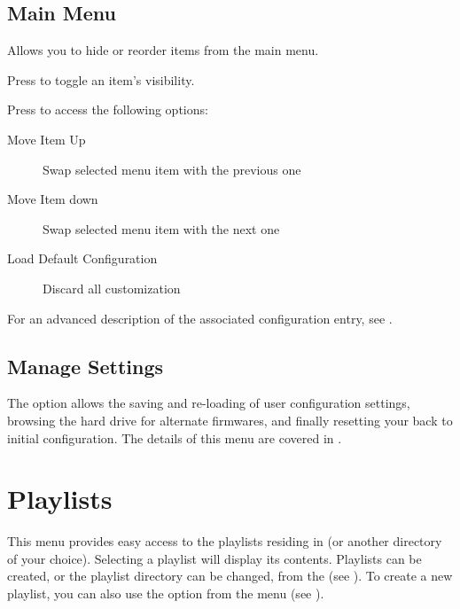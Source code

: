 
\subsection{Main Menu}
{\label{ref:main_menu_config}}
Allows you to hide or reorder items from the main menu.

Press \ActionStdOk{} to toggle an item's visibility.

Press \ActionStdContext{} to access the following options:
\begin{description}
\item[Move Item Up] Swap selected menu item with the previous one
\item[Move Item down] Swap selected menu item with the next one
\item[Load Default Configuration] Discard all customization
\end{description}

For an advanced description of the associated configuration entry,
see .

\subsection{Manage Settings}
The  option allows the saving and re-loading of user 
configuration settings, browsing the hard drive for alternate firmwares, and finally
resetting your \dap{} back to initial configuration.
%
The details of this menu are covered in
.



\section{\label{ref:playlistoptions}Playlists}
  This menu provides easy access to the playlists residing in  (or another
  directory of your choice). Selecting a playlist will display its contents.
  Playlists can be created, or the playlist directory can be changed, from the
   (see ).
  To create a new playlist, you can also use the  option from the
   menu (see ).

